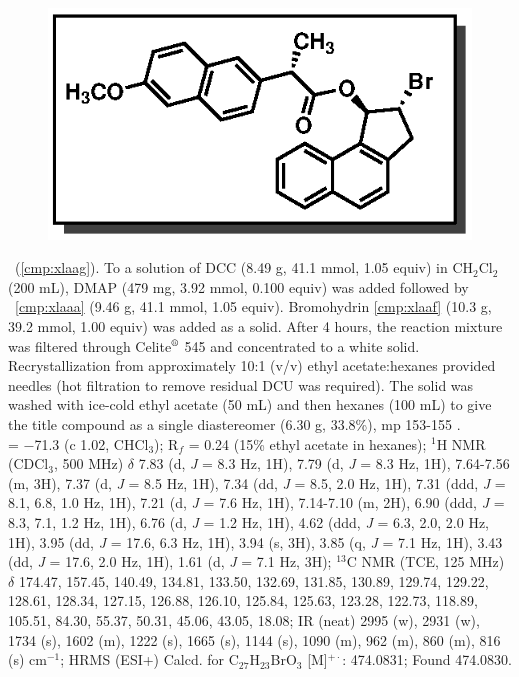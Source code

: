 \vspace{10pt}
\begin{figure}
  \vspace{-30pt}
  \begin{center}
    \includegraphics[scale=0.8]{chp_asymmetric/images/xlaag}
  \end{center}
  \vspace{-30pt}
\end{figure}
\noindent \textbf{\CMPxlaag}\ (\ref{cmp:xlaag}). To a solution of DCC (8.49 g, 41.1
mmol, 1.05 equiv) in CH$_2$Cl$_2$ (200 mL), DMAP (479 mg, 3.92 mmol, 0.100
equiv) was added followed by \CMPxlaaa\  \ref{cmp:xlaaa} (9.46 g, 41.1 mmol,
1.05 equiv).
Bromohydrin \ref{cmp:xlaaf} (10.3 g, 39.2 mmol, 1.00 equiv) was added as a
solid. After 4 hours, the reaction mixture was filtered through
Celite$\textsuperscript{\textregistered}$ 545 and concentrated to a white solid.
Recrystallization from approximately 10:1 (v/v) ethyl acetate:hexanes provided
needles (hot filtration to remove residual DCU was required). The solid was
washed with ice-cold ethyl acetate (50 mL) and then hexanes (100 mL) to give the
title compound as a single diastereomer (6.30 g, 33.8\%), mp 153-155 \degc. \\
\rotation = $-$71.3 (c 1.02, CHCl$_3$); R$_f$ = 0.24 (15\% ethyl acetate in
hexanes); $^1$H NMR (CDCl$_3$, 500 MHz) $\delta$ 7.83 (d, \textit{J} = 8.3 Hz,
1H), 7.79 (d, \textit{J} = 8.3 Hz, 1H), 7.64-7.56 (m, 3H), 7.37 (d, \textit{J} =
8.5 Hz, 1H), 7.34 (dd, \textit{J} = 8.5, 2.0 Hz, 1H), 7.31 (ddd, \textit{J} =
8.1, 6.8, 1.0 Hz, 1H), 7.21 (d, \textit{J} = 7.6 Hz, 1H), 7.14-7.10 (m, 2H),
6.90 (ddd, \textit{J} = 8.3, 7.1, 1.2 Hz, 1H), 6.76 (d, \textit{J} = 1.2 Hz,
1H), 4.62 (ddd, \textit{J} = 6.3, 2.0, 2.0 Hz, 1H), 3.95 (dd, \textit{J} = 17.6,
6.3 Hz, 1H), 3.94 (s, 3H), 3.85 (q, \textit{J} = 7.1 Hz, 1H), 3.43 (dd,
\textit{J} = 17.6, 2.0 Hz, 1H), 1.61 (d, \textit{J} = 7.1 Hz, 3H); $^{13}$C NMR
(TCE, 125 MHz) $\delta$ 174.47, 157.45, 140.49, 134.81, 133.50, 132.69, 131.85, 130.89, 129.74, 129.22, 128.61, 128.34, 127.15, 126.88,
126.10, 125.84, 125.63, 123.28, 122.73, 118.89, 105.51, 84.30, 55.37, 50.31,
45.06, 43.05, 18.08; IR (neat) 2995 (w), 2931 (w), 1734 (s), 1602 (m), 1222 (s),
1665 (s), 1144 (s), 1090 (m), 962 (m), 860 (m), 816 (s) cm$^{-1}$; HRMS (ESI+)
Calcd. for C$_{27}$H$_{23}$BrO$_{3}$ [M]$^{+\cdot}$: 474.0831; Found 474.0830.

